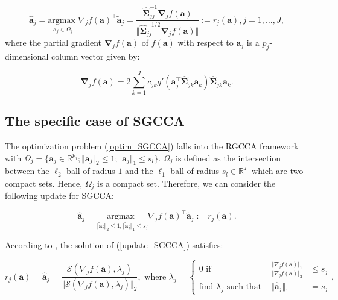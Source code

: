 \documentclass[
]{jss}
\begin{document}
\begin{equation}
\hat{\mathbf{a}}_j = \underset{\tilde{\mathbf{a}}_j\in\Omega_j}{\text{argmax }}  \nabla_j f(\mathbf{a})^\top \tilde{\mathbf{a}}_j = \frac{ \widehat{\mathbf{\Sigma}}_{jj}^{-1} \mathbf \nabla_j f( \mathbf a)}{\Vert  \widehat{\mathbf{\Sigma}}_{jj}^{-1/2} \mathbf \nabla_j f( \mathbf a) \Vert} := r_j( \mathbf a), j=1, \ldots, J,
\label{RGCCA_update}
\end{equation} where the partial gradient
\(\mathbf \nabla_j f( \mathbf a)\) of \(f( \mathbf a)\) with respect to
\(\mathbf a_j\) is a \(p_j\)-dimensional column vector given by:

\begin{equation}
 \mathbf \nabla_j f( \mathbf a)=2\sum_{k=1}^{J}c_{jk}g'\left( \mathbf a_j^\top  \widehat{\mathbf{\Sigma}}_{jk}  \mathbf a_k \right)  \widehat{\mathbf{\Sigma}}_{jk}  \mathbf a_k.
\label{grad_obj_function}
\end{equation}

\hypertarget{the-specific-case-of-sgcca}{%
\subsection{The specific case of
SGCCA}\label{the-specific-case-of-sgcca}}

The optimization problem (\ref{optim_SGCCA}) falls into the RGCCA
framework with
\(\Omega_j = \lbrace \mathbf a_j\in\mathbb{R}^{p_j}; \Vert \mathbf a_j \Vert_2 \leq 1; \Vert \mathbf a_j \Vert_1 \leq s_l\rbrace\).
\(\Omega_j\) is defined as the intersection between the \(\ell_2\)-ball
of radius \(1\) and the \(\ell_1\)-ball of radius
\(s_l \in \mathbb{R}_+^\star\) which are two compact sets. Hence,
\(\Omega_j\) is a compact set. Therefore, we can consider the following
update for SGCCA:

\begin{equation}
    \hat{ \mathbf a}_j = \underset{\Vert \tilde{ \mathbf a}_j \Vert_2 \leq 1 ; \Vert \tilde{ \mathbf a}_j \Vert_1 \leq s_j}{\text{argmax }} \nabla_j f( \mathbf a)^\top \tilde{ \mathbf a}_j := r_j( \mathbf a).
\label{update_SGCCA}
\end{equation}

According to \cite{Witten2009a}, the solution of (\ref{update_SGCCA})
satisfies:

\begin{equation}
    r_j( \mathbf a) = \hat{ \mathbf a}_j = \frac{\mathcal{S}(\nabla_j f( \mathbf a), \lambda_j)}{\Vert \mathcal{S}(\nabla_j f( \mathbf a), \lambda_j)\Vert_2}, \text{ where } \lambda_j = \left\lbrace\begin{array}{ccc}
    0 \text{ if } & \frac{\Vert \nabla_j f( \mathbf a) \Vert_1}{\Vert \nabla_j f( \mathbf a) \Vert_2} & \leq s_j\\
    \text{find } \lambda_j \text{ such that } & \Vert \hat{ \mathbf a}_j \Vert_1 & = s_j    \end{array}\right.,
    \label{SGCCA_sol}
\end{equation}
\end{document}
